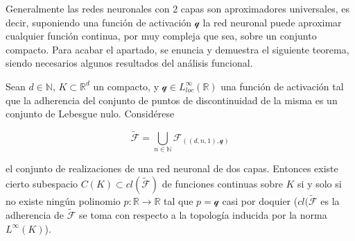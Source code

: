 Generalmente las redes neuronales con 2 capas son aproximadores universales, es decir, suponiendo una función de activación $\mathcal{q}$ la red neuronal puede aproximar cualquier función continua, por muy compleja que sea, sobre un conjunto compacto. Para acabar el apartado, se enuncia y demuestra el siguiente teorema, siendo necesarios algunos resultados del análisis funcional.

\begin{teorema}
Sean $d \in \mathbb{N}$, $K \subset \mathbb{R}^d$ un compacto, y $\mathcal{q} \in L_{loc}^{\infty}(\mathbb{R})$ una función de activación tal que la adherencia del conjunto de puntos de discontinuidad de la misma es un conjunto de Lebesgue nulo. Considérese

$$\tilde{\mathcal{F}} = \bigcup_{n \in \mathbb{N}} \mathcal{F}_{((d,n,1),\mathcal{q})}$$


el conjunto de realizaciones de una red neuronal de dos capas. Entonces existe cierto subespacio $C(K) \subset cl(\tilde{\mathcal{F}})$ de funciones continuas sobre $K$ si y solo si no existe ningún polinomio $p: \mathbb{R} \to \mathbb{R}$ tal que $p=\mathcal{q}$ casi por doquier ($cl(\tilde{\mathcal{F}}$ es la adherencia de $\tilde{\mathcal{F}}$ se toma con respecto a la topología inducida por la norma $L^{\infty}(K)$).
\end{teorema}

